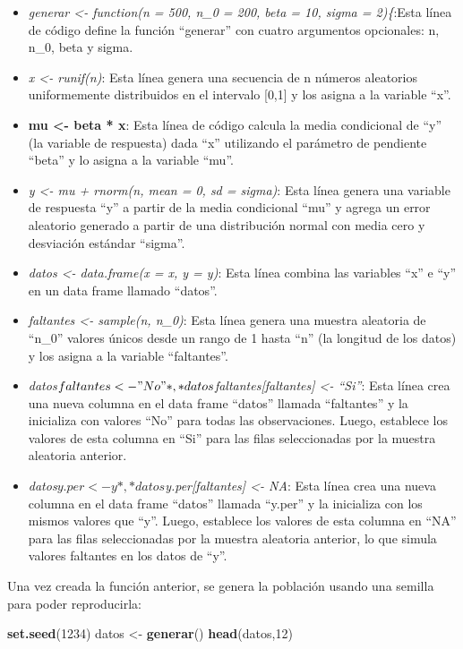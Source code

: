 \documentclass[
  12pt,
]{book}
\newenvironment{Shaded}{\begin{snugshade}}{\end{snugshade}}
\newcommand{\DecValTok}[1]{\textcolor[rgb]{0.00,0.00,0.81}{#1}}
\newcommand{\FunctionTok}[1]{\textcolor[rgb]{0.13,0.29,0.53}{\textbf{#1}}}
\newcommand{\NormalTok}[1]{#1}
\newcommand{\OtherTok}[1]{\textcolor[rgb]{0.56,0.35,0.01}{#1}}
\begin{document}
\begin{itemize}
\item
  \emph{generar \textless- function(n = 500, n\_0 = 200, beta = 10, sigma = 2)\{}:Esta línea de código define la función ``generar'' con cuatro argumentos opcionales: n, n\_0, beta y sigma.
\item
  \emph{x \textless- runif(n)}: Esta línea genera una secuencia de n números aleatorios uniformemente distribuidos en el intervalo {[}0,1{]} y los asigna a la variable ``x''.
\item
  \textbf{mu \textless- beta * x}: Esta línea de código calcula la media condicional de ``y'' (la variable de respuesta) dada ``x'' utilizando el parámetro de pendiente ``beta'' y lo asigna a la variable ``mu''.
\item
  \emph{y \textless- mu + rnorm(n, mean = 0, sd = sigma)}: Esta línea genera una variable de respuesta ``y'' a partir de la media condicional ``mu'' y agrega un error aleatorio generado a partir de una distribución normal con media cero y desviación estándar ``sigma''.
\item
  \emph{datos \textless- data.frame(x = x, y = y)}: Esta línea combina las variables ``x'' e ``y'' en un data frame llamado ``datos''.
\item
  \emph{faltantes \textless- sample(n, n\_0)}: Esta línea genera una muestra aleatoria de ``n\_0'' valores únicos desde un rango de 1 hasta ``n'' (la longitud de los datos) y los asigna a la variable ``faltantes''.
\item
  \emph{datos\(faltantes <- "No"*, *datos\)faltantes{[}faltantes{]} \textless- ``Si''}: Esta línea crea una nueva columna en el data frame ``datos'' llamada ``faltantes'' y la inicializa con valores ``No'' para todas las observaciones. Luego, establece los valores de esta columna en ``Si'' para las filas seleccionadas por la muestra aleatoria anterior.
\item
  \emph{datos\(y.per <- y*, *datos\)y.per{[}faltantes{]} \textless- NA}: Esta línea crea una nueva columna en el data frame ``datos'' llamada ``y.per'' y la inicializa con los mismos valores que ``y''. Luego, establece los valores de esta columna en ``NA'' para las filas seleccionadas por la muestra aleatoria anterior, lo que simula valores faltantes en los datos de ``y''.
\end{itemize}

Una vez creada la función anterior, se genera la población usando una semilla para poder reproducirla:

\begin{Shaded}
\begin{Highlighting}[]
\FunctionTok{set.seed}\NormalTok{(}\DecValTok{1234}\NormalTok{)}
\NormalTok{datos }\OtherTok{\textless{}{-}} \FunctionTok{generar}\NormalTok{()}
\FunctionTok{head}\NormalTok{(datos,}\DecValTok{12}\NormalTok{)}
\end{Highlighting}
\end{Shaded}
\end{document}
